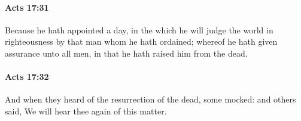 		\paragraph{Acts 17:31} %
			\label{ACTS-17-31}

			Because he hath appointed a day, in the which he will judge the world in righteousness by that man whom he hath ordained; whereof he hath given assurance unto all men, in that he hath raised him from the dead.

			\begin{framed}
			\scriptsize
				\begin{compactdesc}
					\item[SBLG] 
				\end{compactdesc}
			\end{framed}

		\paragraph{Acts 17:32} %
			\label{ACTS-17-32}

			And when they heard of the resurrection of the dead, some mocked: and others said, We will hear thee again of this matter.

